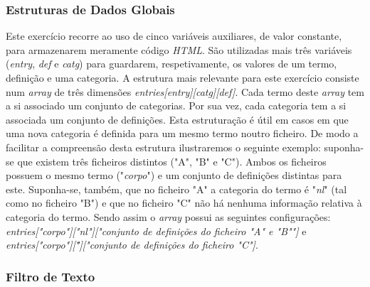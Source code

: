 \documentclass{article}
\begin{document}
\subsubsection{Estruturas de Dados Globais}

Este exercício recorre ao uso de cinco variáveis auxiliares, de valor constante, para armazenarem meramente código \emph{HTML}. São utilizadas mais três variáveis (\emph{entry}, \emph{def} e \emph{catg}) para guardarem, respetivamente, os valores de um termo, definição e uma categoria. A estrutura mais relevante para este exercício consiste num \emph{array} de três dimensões \emph{entries[entry][catg][def]}. Cada termo deste \emph{array} tem a si associado um conjunto de categorias. Por sua vez, cada categoria tem a si associada um conjunto de definições. Esta estruturação é útil em casos em que uma nova categoria é definida para um mesmo termo noutro ficheiro. De modo a facilitar a compreensão desta estrutura ilustraremos o seguinte exemplo: suponha-se que existem três ficheiros distintos ("A", "B" e "C"). Ambos os ficheiros possuem o mesmo termo ("\emph{corpo}") e um conjunto de definições distintas para este. Suponha-se, também, que no ficheiro "A" a categoria do termo é "\emph{nl}" (tal como no ficheiro "B") e que no ficheiro "C" não há nenhuma informação relativa à categoria do termo. Sendo assim o \emph{array} possui as seguintes configurações: \emph{entries["corpo"]["nl"]["conjunto de definições do ficheiro "A" e "B""]} e \emph{entries["corpo"][\" "]["conjunto de definições do ficheiro "C"]}.


\subsubsection{Filtro de Texto}
\end{document}
